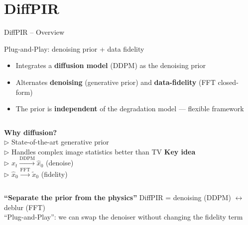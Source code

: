 \documentclass[english,10pt]{beamer}
\begin{document}
\section{DiffPIR}

\begin{frame}{DiffPIR -- Overview}
  \begin{block}{Plug-and-Play: denoising prior + data fidelity}
    \begin{itemize}
      \item Integrates a \textbf{diffusion model} (DDPM) as the denoising prior
      \item Alternates \textbf{denoising} (generative prior) and \textbf{data-fidelity} (FFT closed-form)
      \item The prior is \textbf{independent} of the degradation model --- flexible framework
    \end{itemize}
  \end{block}
  \vspace{0.15cm}
  \begin{columns}[t]
      \textbf{Why diffusion?}\\[0.05cm]
      \small
      $\triangleright$ State-of-the-art generative prior\\[0.05cm]
      $\triangleright$ Handles complex image statistics better than TV
      \textbf{Key idea}\\[0.05cm]
      \small
      $\triangleright$ $x_t \xrightarrow{\text{DDPM}} \hat{x}_0$ (denoise)\\[0.05cm]
      $\triangleright$ $\hat{x}_0 \xrightarrow{\text{FFT}} \tilde{x}_0$ (fidelity)
  \end{columns}

  \vspace{0.12cm}
  \begin{exampleblock}{\centering\small\textbf{``Separate the prior from the physics''}}
    \centering\scriptsize
    DiffPIR = denoising (DDPM) $\leftrightarrow$ deblur (FFT) \\
    ``Plug-and-Play'': we can swap the denoiser without changing the fidelity term
  \end{exampleblock}
\end{frame}
\end{document}
